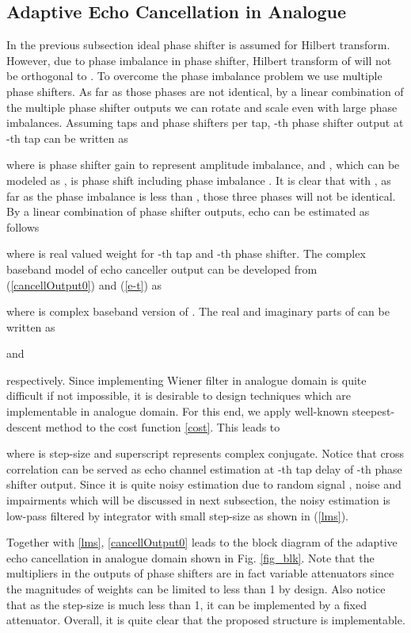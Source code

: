 \documentclass[twocolumn]{IEEEtran}
\begin{document}
\subsection{Adaptive Echo Cancellation in Analogue}

In the previous subsection ideal phase shifter is assumed for
Hilbert transform. However, due to phase imbalance in phase shifter,
Hilbert transform of  will not be orthogonal to
. To overcome the phase imbalance problem we use
multiple phase shifters. As far as those phases are not identical,
by a linear combination of the multiple phase shifter outputs we can
rotate and scale  even with large phase imbalances.
Assuming  taps and  phase shifters per tap, -th phase
shifter output at -th tap can be written as


where  is phase shifter gain to represent amplitude
imbalance, and , which can be modeled as , is phase shift including phase imbalance
. It is clear that with , as far as the phase
imbalance is less than , those three phases will not be
identical. By a linear combination of phase shifter outputs, echo
can be estimated as follows


where  is real valued weight for -th tap and -th
phase shifter. The complex baseband model of echo canceller output
 can be developed from (\ref{cancellOutput0}) and (\ref{e-t})
as


where  is complex baseband version of . The
real and imaginary parts of  can be written as



and

respectively. Since implementing Wiener filter in analogue domain is
quite difficult if not impossible, it is desirable to design
techniques which are implementable in analogue domain. For this end,
we apply well-known steepest-descent method to the cost function
\eqref{cost}. This leads to



\noindent where  is step-size and superscript 
represents complex conjugate. Notice that cross correlation  can be served as echo channel estimation at
-th tap delay of -th phase shifter output. Since it is quite
noisy estimation due to random signal , noise and impairments
which will be discussed in next subsection, the noisy estimation is
low-pass filtered by integrator with small step-size  as shown
in (\ref{lms}).

Together with \eqref{lms}, \eqref{cancellOutput0} leads to the block
diagram of the adaptive echo cancellation in analogue domain shown
in Fig. \ref{fig_blk}. Note that the multipliers in the outputs of
phase shifters are in fact variable attenuators since the magnitudes
of weights can be limited to less than 1 by design. Also notice that
as the step-size  is much less than 1, it can be implemented by
a fixed attenuator. Overall, it is quite clear that the proposed
structure is implementable.
\end{document}
